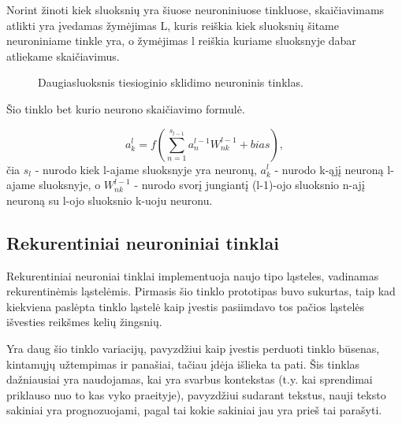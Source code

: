 Norint žinoti kiek sluoksnių yra šiuose neuroniniuose tinkluose, skaičiavimams atlikti yra įvedamas žymėjimas L, kuris reiškia kiek sluoksnių šitame neuroniniame tinkle yra, o žymėjimas l reiškia kuriame sluoksnyje dabar atliekame skaičiavimus.

\begin{figure}[h!]
  \centering
{}
\caption{Daugiasluoksnis tiesioginio sklidimo neuroninis tinklas.}
\label{fig:deepnn}
\end{figure}

Šio tinklo bet kurio neurono skaičiavimo formulė.

\begin{equation*}
  a_k^l = f(\sum_{n=1}^{s_{l-1}} a_n^{l-1}W_{nk}^{l-1} + bias),
\end{equation*}
čia $s_l$ - nurodo kiek l-ajame sluoksnyje yra neuronų, $a_k^l$ - nurodo k-ąjį neuroną l-ajame sluoksnyje, o $W_{nk}^{l-1}$ - nurodo svorį jungiantį (l-1)-ojo sluoksnio n-ajį neuroną su l-ojo sluoksnio k-uoju neuronu.

\subsection{Rekurentiniai neuroniniai tinklai}

Rekurentiniai neuroniai tinklai implementuoja naujo tipo ląsteles, vadinamas rekurentinėmis ląstelėmis. Pirmasis šio tinklo prototipas buvo sukurtas, taip kad kiekviena paslėpta tinklo ląstelė kaip įvestis pasiimdavo tos pačios ląstelės išvesties reikšmes kelių žingsnių. \cite{Balasubramaniam2008}

Yra daug šio tinklo variacijų, pavyzdžiui kaip įvestis perduoti tinklo būsenas, kintamųjų užtempimas ir panašiai, tačiau įdėja išlieka ta pati. Šis tinklas dažniausiai yra naudojamas, kai yra svarbus kontekstas (t.y. kai sprendimai priklauso nuo to kas vyko praeityje), pavyzdžiui sudarant tekstus, nauji teksto sakiniai yra prognozuojami, pagal tai kokie sakiniai jau yra prieš tai parašyti. \cite{Filippo2017}


